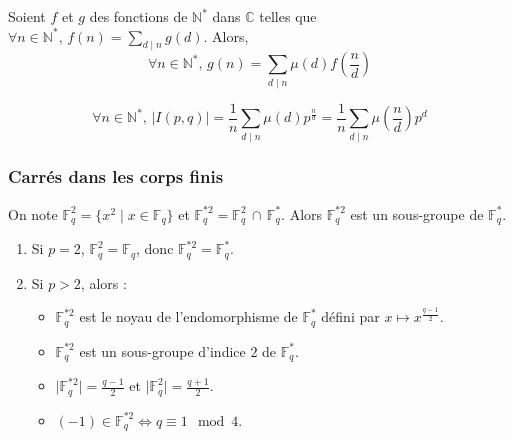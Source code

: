   \begin{theorem}
    Soient $f$ et $g$ des fonctions de $\mathbb{N}^*$ dans $\mathbb{C}$ telles que $\forall n \in \mathbb{N}^*, \, f(n) = \sum_{d \mid n} g(d)$. Alors,
    \[ \forall n \in \mathbb{N}^*, \, g(n) = \sum_{d \mid n} \mu(d) f \left( \frac{n}{d} \right) \]
  \end{theorem}

  \begin{corollary}
    \[ \forall n \in \mathbb{N}^*, \, \vert I(p,q) \vert = \frac{1}{n} \sum_{d \mid n} \mu(d) p^{\frac{n}{d}} = \frac{1}{n} \sum_{d \mid n} \mu \left( \frac{n}{d} \right) p^{d} \]
  \end{corollary}

  \subsubsection{Carrés dans les corps finis}


  \begin{proposition}
    On note $\mathbb{F}_q^2 = \{ x^2 \mid x \in \mathbb{F}_q \}$ et $\mathbb{F}_q^{*2} = \mathbb{F}_q^2 \, \cap \, \mathbb{F}_q^*$. Alors $\mathbb{F}_q^{*2}$ est un sous-groupe de $\mathbb{F}_q^*$.
  \end{proposition}

  \begin{proposition}
    \begin{enumerate}[label=(\roman*)]
      \item Si $p = 2$, $\mathbb{F}_q^2 = \mathbb{F}_q$, donc $\mathbb{F}_q^{*2} = \mathbb{F}_q^*$.
      \item Si $p > 2$, alors :
      \begin{itemize}
        \item $\mathbb{F}_q^{*2}$ est le noyau de l'endomorphisme de $\mathbb{F}_q^*$ défini par $x \mapsto x^{\frac{q-1}{2}}$.
        \item $\mathbb{F}_q^{*2}$ est un sous-groupe d'indice $2$ de $\mathbb{F}_q^*$.
        \item $\vert \mathbb{F}_q^{*2} \vert = \frac{q-1}{2}$ et $\vert \mathbb{F}_q^2 \vert = \frac{q+1}{2}$.
        \item $(-1) \in \mathbb{F}_q^{*2} \iff q \equiv 1 \mod 4$.
      \end{itemize}
    \end{enumerate}
  \end{proposition}


